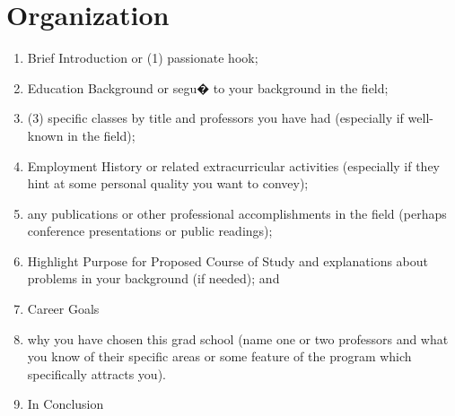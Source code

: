 \documentclass[a4paper,12pt]{article}%
\begin{document}
%	
%	
\section {Organization}
\begin{enumerate}
	\item Brief Introduction  or (1) passionate hook;
	\item  Education Background  or segu� to your background in the field; 
 \item (3) specific classes by title and professors you have had (especially if well-known in the field);
	\item Employment History  or  related extracurricular activities (especially if they hint at some personal quality you want to convey);
 \item any publications or other professional accomplishments in the field (perhaps conference presentations or public readings); 
	\item Highlight Purpose for Proposed Course of Study  and explanations about problems in your background (if needed); and 
	\item Career Goals 
	\item why you have chosen this grad school (name one or two professors and what you know of their specific areas or some feature of the program which specifically attracts you).
	\item In Conclusion
\end{enumerate}
	  \hrulefill
	  
\end{document}
